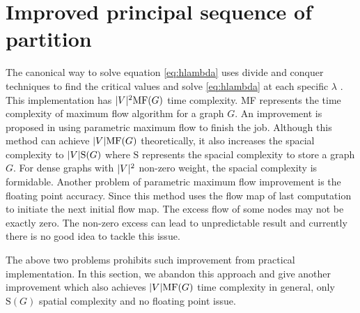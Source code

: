 \documentclass[runningheads]{llncs}
\begin{document}
\section{Improved principal sequence of partition}
The canonical way to solve equation \eqref{eq:hlambda} uses divide and conquer techniques to find the critical values and solve \eqref{eq:hlambda} at each specific $\lambda$ \cite{RN7}.  This implementation has $\lvert V\rvert^2 \textrm{MF}(G)$ time complexity. \textrm{MF} represents the time complexity of maximum flow algorithm for a graph $G$. An improvement is proposed in \cite{RN4} using parametric maximum flow to finish the job. Although this method can achieve $\lvert V\rvert \textrm{MF}(G)$ theoretically, it also increases the spacial complexity to $ \lvert V\rvert \textrm{S}(G)$ where $\textrm{S}$ represents the spacial complexity to store a graph $G$. For dense graphs with $\lvert V\rvert^2$ non-zero weight, the spacial complexity is formidable. 
Another problem of parametric maximum flow improvement is the floating point accuracy. Since this method uses the flow map of last computation to initiate the next initial flow map. The excess flow of some nodes may not be exactly zero. The non-zero excess can lead to unpredictable result and currently there is no good idea to tackle this issue. 

The above two problems prohibits such improvement from practical implementation. In this section, we abandon this approach and give another improvement which also achieves $\lvert V\rvert \textrm{MF}(G)$ time complexity in general, only $\textrm{S}(G)$ spatial complexity and no floating point issue.



%
%
%


%
\end{document}
